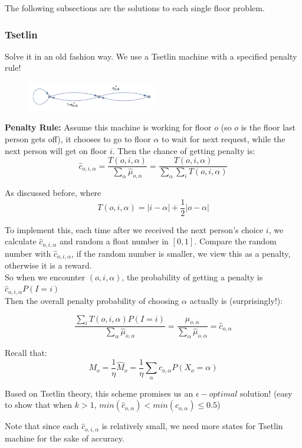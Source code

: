 \documentclass[11pt]{article}
\begin{document}
The following subsections are the solutions to each single floor problem.

\subsubsection{Tsetlin}
Solve it in an old fashion way. We use a Tsetlin machine with a specified penalty rule!
\begin{figure}[H]
\centering
\includegraphics[width=0.5\textwidth]{p1.png}
\end{figure}

\textbf{Penalty Rule:} Assume this machine is working for floor $o$ (so $o$ is the floor last person gets off), it chooses to go to floor $\alpha$ to wait for next request, while the next person will get on floor $i$. Then the chance of getting penalty is:
$$\hat{c}_{o,i,\alpha}=\frac{T(o,i,\alpha)}{\sum_\alpha \hat{\mu}_{o,\alpha}}=\frac{T(o,i,\alpha)}{\sum_\alpha \sum_iT(o,i,\alpha)}$$

As discussed before, where
$$T(o,i,\alpha)=|i-\alpha|+\frac{1}{2}|o-\alpha|$$

To implement this, each time after we received the next person's choice $i$, we calculate $\hat{c}_{o,i,\alpha}$ and random a float number in $[0,1]$. Compare the random number with $\hat{c}_{o,i,\alpha}$, if the random number is smaller, we view this as a penalty, otherwise it is a reward.\\

So when we encounter $(o,i,\alpha)$, the probability of getting a penalty is $\hat{c}_{o,i,\alpha}P(I=i)$\\

Then the overall penalty probability of choosing $\alpha$ actually is (surprisingly!):

$$\frac{\sum_iT(o,i,\alpha)P(I=i)}{\sum_\alpha \hat{\mu}_{o,\alpha}}=\frac{\mu_{o,\alpha}}{\sum_\alpha \hat{\mu}_{o,\alpha}}=\hat{c}_{o,\alpha}$$

Recall that:
$$M_o=\frac{1}{\eta}\hat{M}_o=\frac{1}{\eta}\sum_\alpha \hat{c}_{o,\alpha} P(X_o=\alpha)$$

Based on Tsetlin theory, this scheme promises us an $\epsilon-optimal$ solution! (easy to show that when $k > 1$, $min(\hat{c}_{o,\alpha})<min(c_{o,\alpha}) \leq 0.5$)

Note that since each $\hat{c}_{o,i,\alpha}$ is relatively small, we need more states for Tsetlin machine for the sake of accuracy.
\end{document}
